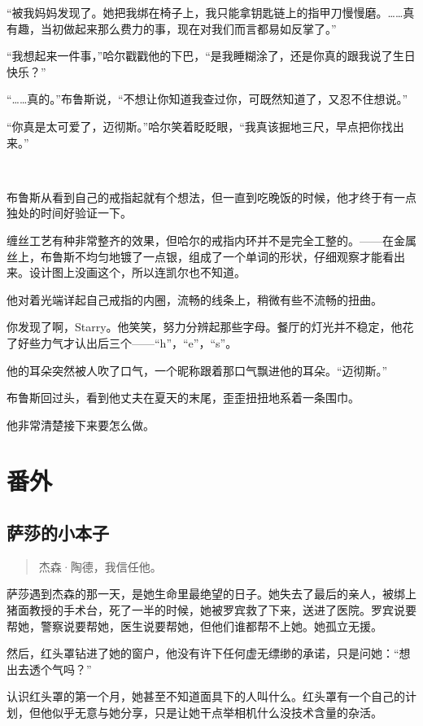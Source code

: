 \documentclass[../main]{subfiles}
\begin{document}
“被我妈妈发现了。她把我绑在椅子上，我只能拿钥匙链上的指甲刀慢慢磨。……真有趣，当初做起来那么费力的事，现在对我们而言都易如反掌了。”

“我想起来一件事，”哈尔戳戳他的下巴，“是我睡糊涂了，还是你真的跟我说了生日快乐？”

“……真的。”布鲁斯说，“不想让你知道我查过你，可既然知道了，又忍不住想说。”

“你真是太可爱了，迈彻斯。”哈尔笑着眨眨眼，“我真该掘地三尺，早点把你找出来。”

~\

布鲁斯从看到自己的戒指起就有个想法，但一直到吃晚饭的时候，他才终于有一点独处的时间好验证一下。

缠丝工艺有种非常整齐的效果，但哈尔的戒指内环并不是完全工整的。——在金属丝上，布鲁斯不均匀地镀了一点银，组成了一个单词的形状，仔细观察才能看出来。设计图上没画这个，所以连凯尔也不知道。

他对着光端详起自己戒指的内圈，流畅的线条上，稍微有些不流畅的扭曲。

你发现了啊，Starry。他笑笑，努力分辨起那些字母。餐厅的灯光并不稳定，他花了好些力气才认出后三个——“h”，“e”，“s”。

他的耳朵突然被人吹了口气，一个昵称跟着那口气飘进他的耳朵。“迈彻斯。”

布鲁斯回过头，看到他丈夫在夏天的末尾，歪歪扭扭地系着一条围巾。

他非常清楚接下来要怎么做。

\storyend[正文完]

\section*{番外}

\subsection{萨莎的小本子}

\begin{quote}
    杰森·陶德，我信任他。
\end{quote}

萨莎遇到杰森的那一天，是她生命里最绝望的日子。她失去了最后的亲人，被绑上猪面教授的手术台，死了一半的时候，她被罗宾救了下来，送进了医院。罗宾说要帮她，警察说要帮她，医生说要帮她，但他们谁都帮不上她。她孤立无援。

然后，红头罩钻进了她的窗户，他没有许下任何虚无缥缈的承诺，只是问她：“想出去透个气吗？”

认识红头罩的第一个月，她甚至不知道面具下的人叫什么。红头罩有一个自己的计划，但他似乎无意与她分享，只是让她干点举相机什么没技术含量的杂活。
\end{document}
